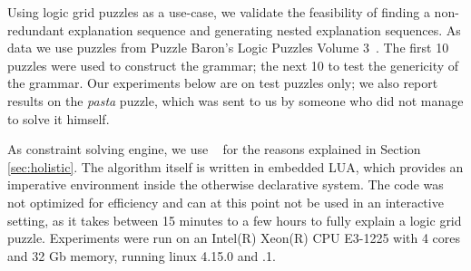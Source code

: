 Using logic grid puzzles as a use-case, we validate the feasibility of finding a non-redundant explanation sequence and generating nested explanation sequences.
As data we use puzzles from Puzzle Baron’s Logic Puzzles Volume 3~\cite{logigrammen}. 
The first 10 puzzles were used to construct the grammar; the next 10 to test the genericity of the grammar. 
Our experiments below are on test puzzles only; we also report results on the \textit{pasta} puzzle, which was sent to us by someone who did not manage to solve it himself.

As constraint solving engine, we use \idp~\cite{IDP} for the reasons explained in Section \ref{sec:holistic}. 
The algorithm itself is written in embedded LUA, which provides an imperative environment inside the otherwise declarative \idp system. 
The code was not optimized for efficiency and can at this point not be used in an interactive setting, as it takes between 15 minutes to a few hours to fully explain a logic grid puzzle. 
Experiments were run on an Intel(R) Xeon(R) CPU E3-1225 with 4 cores and 32 Gb memory, running linux 4.15.0 and .1.

